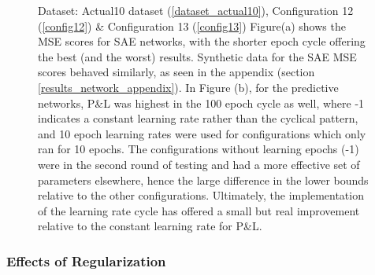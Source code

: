 \documentclass[a4paper,11pt,oneside]{article}
\theoremstyle{plain}
\theoremstyle{definition}
\begin{document}
\begin{figure}[H]
\begin{subfigure}{.5\textwidth}
{				\newline }
			\label{figure-actual_pl_lr_epochs}
		\end{subfigure}
		\caption[Effects of Epoch Cycle Lengths (Actual Data)]{Dataset: Actual10 dataset (\ref{dataset_actual10}), Configuration 12 (\ref{config12}) \& Configuration 13 (\ref{config13})
			\newline Figure(a) shows the MSE scores for SAE networks, with the shorter epoch cycle offering the best (and the worst) results. Synthetic data for the SAE MSE scores behaved similarly, as seen in the appendix (section \ref{results_network_appendix}). 
			\newline In Figure (b), for the predictive networks, P\&L was highest in the 100 epoch cycle as well, where -1 indicates a constant learning rate rather than the cyclical pattern, and 10 epoch learning rates were used for configurations which only ran for 10 epochs. The configurations without learning epochs (-1) were in the second round of testing and had a more effective set of parameters elsewhere, hence the large difference in the lower bounds relative to the other configurations. Ultimately, the implementation of the learning rate cycle has offered a small but real improvement relative to the constant learning rate for P\&L.}
		\label{figure-epochs_lr}
	\end{figure}
	
	

	
	
	
	
	
	
	\subsubsection{Effects of Regularization}
	
\end{document}
